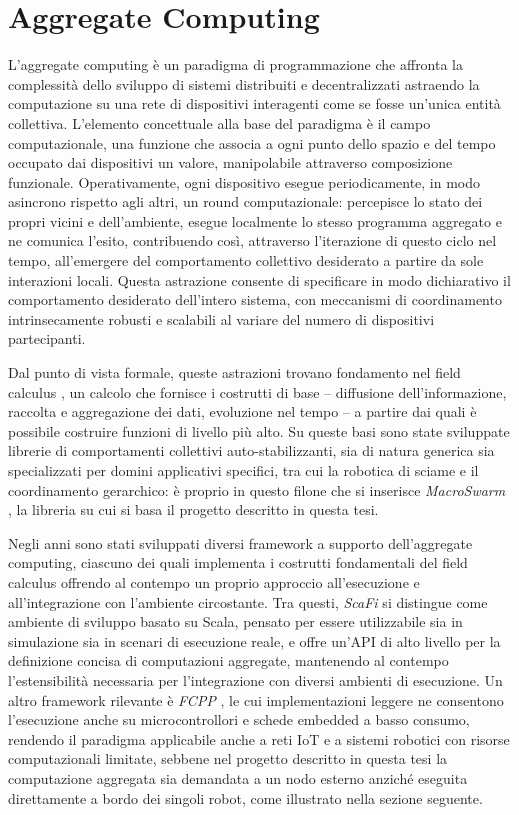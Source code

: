 \section{Aggregate Computing}
\label{sec:introduzione-aggregate-computing}
%
L'aggregate computing \cite{aggregateprogramming} è un paradigma di programmazione che affronta la complessità dello sviluppo di sistemi distribuiti e decentralizzati astraendo la computazione su una rete di dispositivi interagenti come se fosse un'unica entità collettiva. L'elemento concettuale alla base del paradigma è il campo computazionale, una funzione che associa a ogni punto dello spazio e del tempo occupato dai dispositivi un valore, manipolabile attraverso composizione funzionale. Operativamente, ogni dispositivo esegue periodicamente, in modo asincrono rispetto agli altri, un round computazionale: percepisce lo stato dei propri vicini e dell'ambiente, esegue localmente lo stesso programma aggregato e ne comunica l'esito, contribuendo così, attraverso l'iterazione di questo ciclo nel tempo, all'emergere del comportamento collettivo desiderato a partire da sole interazioni locali. Questa astrazione consente di specificare in modo dichiarativo il comportamento desiderato dell'intero sistema, con meccanismi di coordinamento intrinsecamente robusti e scalabili al variare del numero di dispositivi partecipanti.

Dal punto di vista formale, queste astrazioni trovano fondamento nel field calculus \cite{fieldcalculus}, un calcolo che fornisce i costrutti di base -- diffusione dell'informazione, raccolta e aggregazione dei dati, evoluzione nel tempo -- a partire dai quali è possibile costruire funzioni di livello più alto. Su queste basi sono state sviluppate librerie di comportamenti collettivi auto-stabilizzanti, sia di natura generica sia specializzati per domini applicativi specifici, tra cui la robotica di sciame e il coordinamento gerarchico: è proprio in questo filone che si inserisce \textit{MacroSwarm} \cite{aguzzi2024macroswarm}, la libreria su cui si basa il progetto descritto in questa tesi.

Negli anni sono stati sviluppati diversi framework a supporto dell'aggregate computing, ciascuno dei quali implementa i costrutti fondamentali del field calculus offrendo al contempo un proprio approccio all'esecuzione e all'integrazione con l'ambiente circostante. Tra questi, \textit{ScaFi} \cite{casadei2022scafi} si distingue come ambiente di sviluppo basato su Scala, pensato per essere utilizzabile sia in simulazione sia in scenari di esecuzione reale, e offre un'API di alto livello per la definizione concisa di computazioni aggregate, mantenendo al contempo l'estensibilità necessaria per l'integrazione con diversi ambienti di esecuzione. Un altro framework rilevante è \textit{FCPP} \cite{audrito2024fcpp}, le cui implementazioni leggere ne consentono l'esecuzione anche su microcontrollori e schede embedded a basso consumo, rendendo il paradigma applicabile anche a reti IoT e a sistemi robotici con risorse computazionali limitate, sebbene nel progetto descritto in questa tesi la computazione aggregata sia demandata a un nodo esterno anziché eseguita direttamente a bordo dei singoli robot, come illustrato nella sezione seguente.